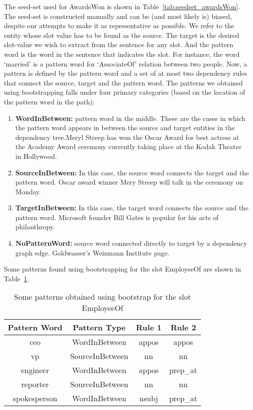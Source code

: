 \begin{itemize}[label={}]
The seed-set used for AwardsWon is shown in Table~\ref{tab:seedset_awardsWon}. The seed-set is constructed manually and can be (and most likely is) biased, despite our attempts to make it as representative as possible. We refer to the entity whose slot value has to be found as the source. The target is the desired slot-value we wish to extract from the sentence for any slot. And the pattern word is the word in the sentence that indicates the slot. For instance, the word ‘married’ is a pattern word for ‘AssociateOf’ relation between two people. Now, a pattern is defined by the pattern word and a set of at most two dependency rules that connect the source, target and the pattern word. The patterns we obtained using bootstrapping falls under four primary categories (based on the location of the pattern word in the path): 
\begin{enumerate}
\item \textbf{WordInBetween:} pattern word in the middle. These are the cases in which the pattern word appears in between the source and target entities in the dependency tree.Meryl Streep has won the Oscar Award for best actress at the Academy Award ceremony currently taking place at the Kodak Theatre in Hollywood.
\item \textbf{SourceInBetween:} In this case, the source word connects the target and the pattern word. Oscar award winner Mery Streep will talk in the ceremony on Monday.
\item \textbf{TargetInBetween:} In this case, the target word connects the source and the pattern word. Microsoft founder Bill Gates is popular for his acts of philanthropy.
\item \textbf{NoPatternWord:} source word connected directly to target by a dependency graph edge. Goldwasser's Weizmann Institute page.
\end{enumerate}
Some patterns found using bootstrapping for the slot EmployeeOf are shown in Table~\ref{tab:patterns_employeeOf}. 

\begin{table}[ht]
\centering
\begin{tabular}{|c|c|c|c|}
\hline
Pattern Word & Pattern Type & Rule 1 & Rule 2 \\
\hline
ceo & WordInBetween & appos & appos \\
vp & SourceInBetween & nn & nn \\
engineer & WordInBetween & appos & prep\_at \\
reporter & SourceInBetween & nn & nn \\
spokesperson & WordInBetween & nsubj & prep\_at \\
\hline
\end{tabular}
\caption{Some patterns obtained using bootstrap for the slot EmployeeOf}
\label{tab:patterns_employeeOf}
\end{table}


\end{itemize}
